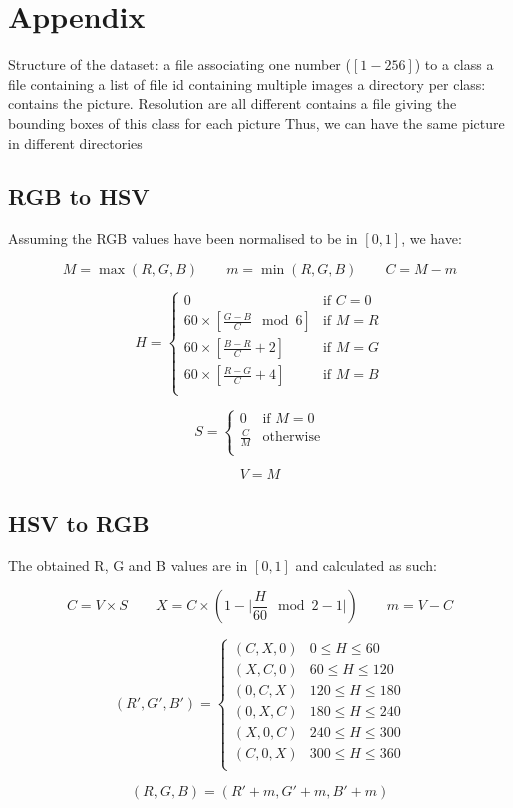 %
%
\appendix

\chapter{Appendix}

Structure of the dataset:
a file associating one number ($[1 - 256]$) to a class
a file containing a list of file id containing multiple images
a directory per class: contains the picture. Resolution are all different
	contains a file giving the bounding boxes of this class for each picture
	Thus, we can have the same picture in different directories

\section{RGB to HSV}

Assuming the RGB values have been normalised to be in $[0, 1]$, we have:

\begin{equation*}
    M = \max (R, G, B)
    \qquad
    m = \min (R, G, B)
    \qquad
    C = M - m
\end{equation*}

$$
H =
\begin{cases}
0 & \text{if $C = 0$}\\
60 \times \left[ \frac{G - B}{C} \mod 6\right] & \text{if $M = R$} \\
60 \times \left[ \frac{B - R}{C} + 2\right] & \text{if $M = G$} \\
60 \times \left[ \frac{R - G}{C} + 4\right] & \text{if $M = B$} \\
\end{cases}
$$

$$
S =
\begin{cases}
0 & \text{if $M = 0$}\\
\frac{C}{M}& \text{otherwise} \\
\end{cases}
$$

$$V = M$$

\section{HSV to RGB}

The obtained R, G and B values are in $[0, 1]$ and calculated as such:

\begin{equation*}
    C = V \times S
    \qquad
    X = C \times (1 - \lvert \frac{H}{60} \mod 2 - 1\rvert )
    \qquad
    m = V - C
\end{equation*}

$$
(R', G', B') = 
\begin{cases}
(C, X, 0) & 0 \leq H \leq 60 \\
(X, C, 0) & 60 \leq H \leq 120 \\
(0, C, X) & 120 \leq H \leq 180 \\
(0, X, C) & 180 \leq H \leq 240 \\
(X, 0, C) & 240 \leq H \leq 300 \\
(C, 0, X) & 300 \leq H \leq 360 \\
\end{cases}
$$

$$ (R, G, B) = (R' + m, G' + m, B' + m)$$